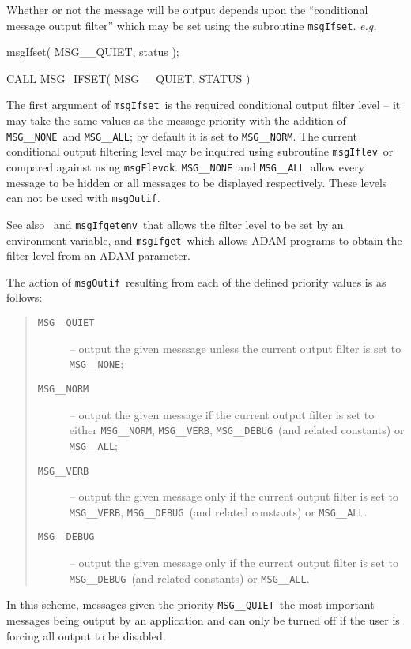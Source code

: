 \documentclass[twoside,11pt]{starlink}
\providecommand{\func}[1]{\texttt{#1}}
\providecommand{\const}[1]{\texttt{#1}}
\providecommand{\msgnone}{\const{MSG\_\_NONE}}
\providecommand{\msgall}{\const{MSG\_\_ALL}}
\providecommand{\msgnorm}{\const{MSG\_\_NORM}}
\providecommand{\msgverb}{\const{MSG\_\_VERB}}
\providecommand{\msgquiet}{\const{MSG\_\_QUIET}}
\providecommand{\msgdebug}{\const{MSG\_\_DEBUG}}
\providecommand{\msgflevok}{\func{msgFlevok}}
\providecommand{\msgifget}{\func{msgIfget}}
\providecommand{\msgifgetenv}{\func{msgIfgetenv}}
\providecommand{\msgiflev}{\func{msgIflev}}
\providecommand{\msgifset}{\func{msgIfset}}
\providecommand{\msgoutif}{\func{msgOutif}}
\providecommand{\msgtune}{\htmlref{\func{msgTune}}{MSG_TUNE}}
\begin{document}
Whether or not the message will be output depends upon the ``conditional
message output filter'' which may be set using the subroutine \msgifset.
\textit{e.g.}
\begin {small}
\begin{terminalv}
      msgIfset( MSG__QUIET, status );

      CALL MSG_IFSET( MSG__QUIET, STATUS )
\end{terminalv}
\end {small}
The first argument of \msgifset\ is the required conditional output filter
level -- it may take the same values as the message priority with the
addition of \msgnone\ and \msgall; by default it is set to \msgnorm.
The current conditional output filtering level may be inquired using
subroutine \msgiflev\ or compared against using
\msgflevok. \msgnone\ and \msgall\ allow every message to be
hidden or all messages to be displayed respectively. These levels can
not be used with \msgoutif.

See also \msgtune\ and \msgifgetenv\
that allows the filter level to be set by an environment variable, and
\msgifget\
which allows ADAM programs to obtain the filter level from an ADAM parameter.

The action of \msgoutif\ resulting from each of the defined priority values is
as follows:
\begin {quote}
\begin {description}
\item [\msgquiet] -- output the given messsage unless the current
output filter is set to \msgnone;
\item [\msgnorm] -- output the given message if the current output filter is
set to either \msgnorm, \msgverb, \msgdebug\ (and related constants) or
\msgall;
\item [\msgverb] -- output the given message only if the current output
filter is set to \msgverb, \msgdebug\ (and related constants) or \msgall.
\item [\msgdebug] -- output the given message only if the current output
filter is set to \msgdebug\ (and related constants) or \msgall.

\end {description}
\end {quote}
In this scheme, messages given the priority \msgquiet\
the most important messages being
output by an application and can only be turned off if the user is
forcing all output to be disabled.
\end{document}
